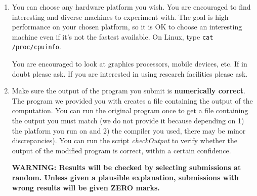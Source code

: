 \documentclass{article}
\begin{document}
\begin{enumerate}
\item You can choose any hardware platform you wish. You are encouraged to find interesting and diverse machines to experiment with. The goal is high performance on your chosen platform, so it is OK to choose an interesting machine even if it's not the fastest available. On Linux, type \texttt{cat /proc/cpuinfo}.

You are encouraged to look at graphics processors, mobile devices, etc.  If in doubt please ask.  
If you are interested in using research facilities please ask.

\item Make sure the output of the program you submit is \textbf{numerically correct}. The program we provided you with creates a file containing the output of the computation. You can run the original program once to get a file containing the output you must match (we do not provide it because depending on 1) the platform you run on and 2) the compiler you used, there may be minor discrepancies). You can run the script \emph{checkOutput} to verify whether the output of the modified program is correct, within a certain confidence. 

\textbf{WARNING: Results will be checked by selecting submissions at random. Unless given a plausible explanation, submissions with wrong results will be given ZERO marks.}


\end{enumerate}
\end{document}
